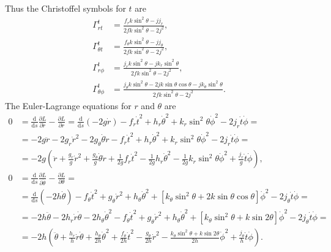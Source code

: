 \documentclass[english, parskip=full]{scrartcl}
\newcommand{\kla}{}
\newcommand{\tecxt}{}
\begin{document}
Thus the Christoffel symbols for $t$ are
\begin{align}
\Gamma^t_{rt} &= \frac{f_rk\sin^2\theta - jj_r}{2fk\sin^2\theta - 2j^2} ,\\
\Gamma^t_{\theta t} &= \frac{f_\theta k\sin^2\theta - jj_\theta}{2fk\sin^2\theta - 2j^2} ,\\
\Gamma^t_{r\phi} &= \frac{j_r k\sin^2\theta - jk_r\sin^2\theta}{2fk\sin^2\theta - 2j^2} ,\\
\Gamma^t_{\theta\phi} &= \frac{j_\theta k\sin^2\theta - 2jk\sin\theta\cos\theta - jk_\theta\sin^2\theta}{2fk\sin^2\theta - 2j^2}.
\end{align}
The Euler-Lagrange equations for $r$ and $\theta$ are
\begin{align}
0 &= \frac{\tecxt\text{d}}{\tecxt\text{d}s} \frac{\partial L}{\partial \dot{r}} - \frac{\partial L}{\partial r} = \frac{\tecxt\text{d}}{\tecxt\text{d}s} \kla\left( -2g\dot{r} \right) - f_r\dot{t}^2 + h_r\dot{\theta}^2 + k_r\sin^2\theta \dot{\phi}^2 - 2j_r\dot{t}\dot{\phi} = \\
&= -2g\ddot{r} - 2g_r\dot{r}^2 - 2g_\theta \dot{\theta}\dot{r} - f_r\dot{t}^2 + h_r\dot{\theta}^2 + k_r\sin^2\theta \dot{\phi}^2 - 2j_r\dot{t}\dot{\phi} = \\
&= -2g \kla\left( \ddot{r} + \frac{g_r}{g}\dot{r}^2 + \frac{g_\theta }{g} \dot{\theta}\dot{r} + \frac{1}{2g} f_r\dot{t}^2 -\frac{1}{2g} h_r\dot{\theta}^2 -\frac{1}{2g} k_r\sin^2\theta \dot{\phi}^2 + \frac{j_r}{g} \dot{t}\dot{\phi} \right) ,\\
0 &= \frac{\tecxt\text{d}}{\tecxt\text{d}s} \frac{\partial L}{\partial \dot{\theta}} - \frac{\partial L}{\partial \theta} = \\
&= \frac{\tecxt\text{d}}{\tecxt\text{d}s} \kla\left( -2h\dot{\theta} \right) - f_\theta\dot{t}^2 + g_\theta \dot{r}^2 + h_\theta \dot{\theta}^2 + [k_\theta \sin^2\theta +2k\sin\theta\cos\theta ] \dot{\phi}^2 - 2j_\theta \dot{t}\dot{\phi} = \\
&= -2h\ddot{\theta} - 2h_r\dot{r}\dot{\theta} - 2h_\theta\dot{\theta}^2 - f_\theta\dot{t}^2 + g_\theta \dot{r}^2 + h_\theta \dot{\theta}^2 + [k_\theta \sin^2\theta + k\sin2\theta ] \dot{\phi}^2 - 2j_\theta \dot{t}\dot{\phi} = \\
&= -2h \kla\left( \ddot{\theta} + \frac{h_r}{h} \dot{r}\dot{\theta} + \frac{h_\theta}{2h} \dot{\theta}^2 + \frac{f_\theta}{2h} \dot{t}^2 - \frac{g_\theta}{2h}  \dot{r}^2 - \frac{k_\theta \sin^2\theta + k\sin2\theta}{2h} \dot{\phi}^2 + \frac{j_\theta }{h} \dot{t}\dot{\phi} \right).
\end{align}
\end{document}
